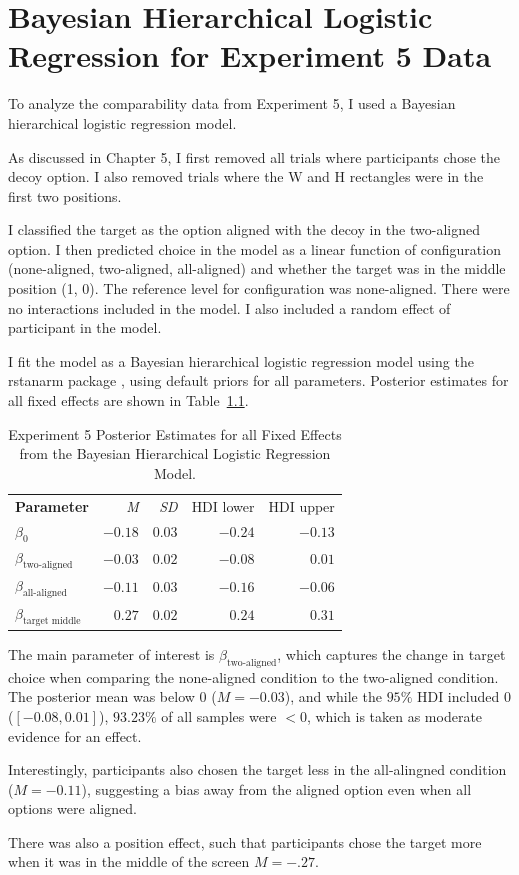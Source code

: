 \chapter{Bayesian Hierarchical Logistic Regression for Experiment 5 Data}

To analyze the comparability data from Experiment 5, I used a Bayesian hierarchical logistic regression model.

As discussed in Chapter 5, I first removed all trials where participants chose the decoy option. I also removed trials where the W and H rectangles were in the first two positions. 

I classified the target as the option aligned with the decoy in the two-aligned option. I then predicted choice in the model as a linear function of configuration (none-aligned, two-aligned, all-aligned) and whether the target was in the middle position (1, 0). The reference level for configuration was none-aligned. There were no interactions included in the model. I also included a random effect of participant in the model. 

I fit the model as a Bayesian hierarchical logistic regression model using the rstanarm package \parencite{rstanarm}, using default priors for all parameters. Posterior estimates for all fixed effects are shown in Table~\ref{tab:e5_logit_params}.

\begin{table}[ht]
    \centering
    \begin{tabular}{lrrrr}
        \toprule
        \textbf{Parameter} & \textit{M} & \textit{SD} & HDI lower & HDI upper \\
        $\beta_{0}$        & $-0.18$    &  $0.03$     & $-0.24$   & $-0.13$   \\
        $\beta_{\text{two-aligned}}$ & $-0.03$ & $0.02$ & $-0.08$ & $0.01$    \\
        $\beta_{\text{all-aligned}}$ & $-0.11$ & $0.03$ & $-0.16$ & $-0.06$   \\
        $\beta_{\text{target middle}}$ & $0.27$ & $0.02$ & $0.24$ & $0.31$    \\
    \end{tabular}
    \caption{Experiment 5 Posterior Estimates for all Fixed Effects from the Bayesian Hierarchical Logistic Regression Model.}
    \label{tab:e5_logit_params}
\end{table}

The main parameter of interest is $\beta_{\text{two-aligned}}$, which captures the change in target choice when comparing the none-aligned condition to the two-aligned condition. The posterior mean was below $0$ ($\textit{M}=-0.03$), and while the $95\%$ HDI included 0 ($[-0.08, 0.01]$), $93.23\%$ of all samples were $<0$, which is taken as moderate evidence for an effect. 

Interestingly, participants also chosen the target less in the all-alingned condition ($\textit{M}=-0.11$), suggesting a bias away from the aligned option even when all options were aligned. 

There was also a position effect, such that participants chose the target more when it was in the middle of the screen $\textit{M}=-.27$. 